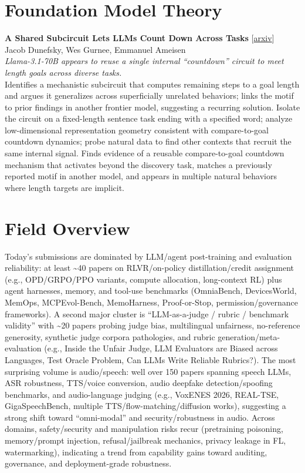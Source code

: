\documentclass[12pt,letterpaper]{article}
\begin{document}
\medskip


\section*{Foundation Model Theory}

{\small\textbf{A Shared Subcircuit Lets LLMs Count Down Across Tasks}} {\scriptsize[\href{https://arxiv.org/abs/2607.12279}{arxiv}]}\\
{\scriptsize Jacob Dunefsky, Wes Gurnee, Emmanuel Ameisen}\\

{\small\textit{Llama-3.1-70B appears to reuse a single internal ``countdown'' circuit to meet length goals across diverse tasks.}}\\[1pt]
{\footnotesize Identifies a mechanistic subcircuit that computes remaining steps to a goal length and argues it generalizes across superficially unrelated behaviors; links the motif to prior findings in another frontier model, suggesting a recurring solution. Isolate the circuit on a fixed-length sentence task ending with a specified word; analyze low-dimensional representation geometry consistent with compare-to-goal countdown dynamics; probe natural data to find other contexts that recruit the same internal signal. Finds evidence of a reusable compare-to-goal countdown mechanism that activates beyond the discovery task, matches a previously reported motif in another model, and appears in multiple natural behaviors where length targets are implicit.}

\medskip



\section*{Field Overview}
{\footnotesize Today's submissions are dominated by LLM/agent post-training and evaluation reliability: at least \textasciitilde{}40 papers on RLVR/on-policy distillation/credit assignment (e.g., OPD/GRPO/PPO variants, compute allocation, long-context RL) plus agent harnesses, memory, and tool-use benchmarks (OmniaBench, DevicesWorld, MemOps, MCPEvol-Bench, MemoHarness, Proof-or-Stop, permission/governance frameworks). A second major cluster is ``LLM-as-a-judge / rubric / benchmark validity'' with \textasciitilde{}20 papers probing judge bias, multilingual unfairness, no-reference generosity, synthetic judge corpora pathologies, and rubric generation/meta-evaluation (e.g., Inside the Unfair Judge, LLM Evaluators are Biased across Languages, Test Oracle Problem, Can LLMs Write Reliable Rubrics?). The most surprising volume is audio/speech: well over 150 papers spanning speech LLMs, ASR robustness, TTS/voice conversion, audio deepfake detection/spoofing benchmarks, and audio-language judging (e.g., VoxENES 2026, REAL-TSE, GigaSpeechBench, multiple TTS/flow-matching/diffusion works), suggesting a strong shift toward ``omni-modal'' and security/robustness in audio. Across domains, safety/security and manipulation risks recur (pretraining poisoning, memory/prompt injection, refusal/jailbreak mechanics, privacy leakage in FL, watermarking), indicating a trend from capability gains toward auditing, governance, and deployment-grade robustness.}
\end{document}
